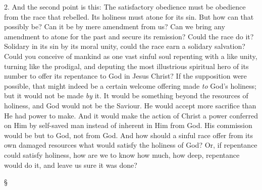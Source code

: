 \documentclass[12pt,letterpaper,oneside]{book}
\begin{document}
2. And the second point is this: The satisfactory 
obedience must be obedience from the race 
that rebelled. Its holiness must atone for its sin. 
But how can that possibly be? Can it be by mere 
amendment from us? Can we bring any amendment 
to atone for the past and secure its 
remission? Could the race do it? Solidary in 
its sin by its moral unity, could the race earn a 
solidary salvation? Could you conceive of mankind 
as one vast sinful soul repenting with a 
like unity, turning like the prodigal, and deputing 
the most illustrious spiritual hero of its number 
to offer its repentance to God in Jesus Christ? If 
the supposition were possible, that might indeed 
be a certain welcome offering made \textit{to} God's 
holiness; but it would not be made \textit{by} it. It 
would be something beyond the resources of 
holiness, and God would not be the Saviour. 
He would accept more sacrifice than He had 
power to make. And it would make the action 
of Christ a power conferred on Him by self-saved 
man instead of inherent in Him from 
God. His commission would be but to God, not 
from God. And how should a sinful race offer 
from its own damaged resources what would 
satisfy the holiness of God? Or, if repentance 
could satisfy holiness, how are we to know how 
much, how deep, repentance would do it, and 
leave us sure it was done? 

\begin{center}
\S
\end{center}
\end{document}

